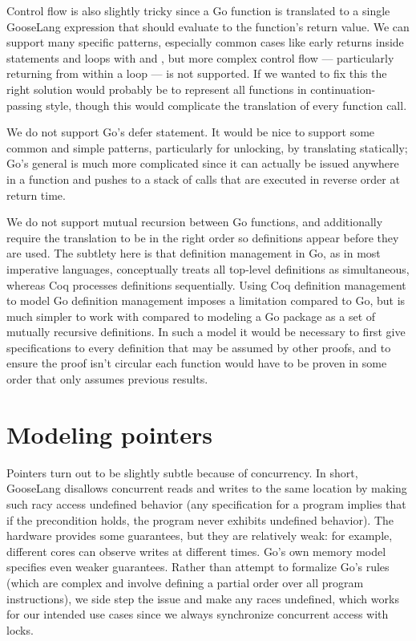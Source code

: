 Control flow is also slightly tricky since a Go function is translated
to a single GooseLang expression that should evaluate to the function's
return value. We can support many specific patterns, especially common
cases like early returns inside  statements and loops with
 and , but more complex control flow ---
particularly returning from within a loop --- is not supported. If we
wanted to fix this the right solution would probably be to represent all
functions in continuation-passing style, though this would complicate
the translation of every function call.

We do not support Go's defer statement. It would be nice to support some
common and simple patterns, particularly for unlocking, by translating
 statically; Go's general  is much more
complicated since it can actually be issued anywhere in a function and
pushes to a stack of calls that are executed in reverse order at return
time.

We do not support mutual recursion between Go functions, and
additionally require the translation to be in the right order so
definitions appear before they are used. The subtlety here is that
definition management in Go, as in most imperative languages,
conceptually treats all top-level definitions as simultaneous, whereas
Coq processes definitions sequentially. Using Coq definition management
to model Go definition management imposes a limitation compared to Go,
but is much simpler to work with compared to modeling a Go package as a
set of mutually recursive definitions. In such a model it would be
necessary to first give specifications to every definition that may be
assumed by other proofs, and to ensure the proof isn't circular each
function would have to be proven in some order that only assumes
previous results.

\section{Modeling pointers}

Pointers turn out to be slightly subtle because of concurrency. In
short, GooseLang disallows concurrent reads and writes to the same
location by making such racy access undefined behavior (any
specification for a program implies that if the precondition holds, the
program never exhibits undefined behavior). The hardware provides some
guarantees, but they are relatively weak: for example, different cores
can observe writes at different times. Go's own memory model specifies
even weaker guarantees. Rather than attempt to formalize Go's rules
(which are complex and involve defining a partial order over all program
instructions), we side step the issue and make any races undefined,
which works for our intended use cases since we always synchronize
concurrent access with locks.

